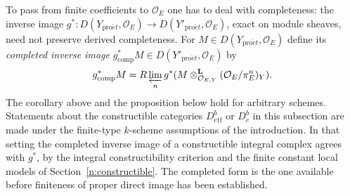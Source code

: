 \documentclass[11pt,a4paper]{article}
\numberwithin{equation}{section}
\theoremstyle{definition}
\theoremstyle{remark}
\newcommand{\Dbc}{D^b_c}
\newcommand{\proet}{\mathrm{pro}\acute{e}t}
\newcommand{\Dctf}{D^b_{\mathrm{ctf}}}
\begin{document}
To pass from finite coefficients to $\mathcal O_E$ one has to deal with
completeness: the inverse image
$g^*\colon D(Y_{\proet},\mathcal O_E)\to D(Y'_{\proet},\mathcal O_E)$,
exact on module sheaves, need not preserve derived completeness. For
$M\in D(Y_{\proet},\mathcal O_E)$ define its \emph{completed inverse
image} $g^*_{\mathrm{comp}}M\in D(Y'_{\proet},\mathcal O_E)$ by
\[
 g^*_{\mathrm{comp}}M
   =R\varprojlim_n g^*(M\otimes^{\mathbf L}_{\mathcal O_{E,Y}}
                                  (\mathcal O_E/\pi_E^n)_Y).
\]
The corollary above and the proposition below hold for arbitrary
schemes. Statements about the constructible categories $\Dctf$ or
$\Dbc$ in this subsection are made under the finite-type $k$-scheme
assumptions of the introduction. In that setting the completed inverse
image of a constructible integral complex agrees with $g^*$, by the
integral constructibility criterion and the finite constant local
models of Section~\ref{n:constructible}. The completed form is the one
available before finiteness of proper direct image has been established.
\end{document}
